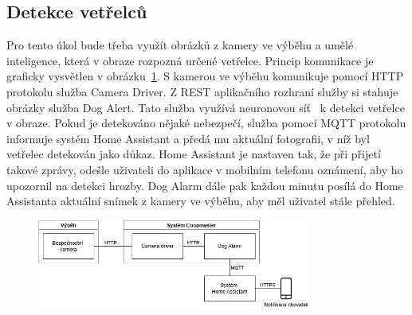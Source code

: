 \subsection{Detekce vetřelců}
Pro tento úkol bude třeba využít obrázků z kamery ve výběhu a umělé inteligence, která v obraze rozpozná určené vetřelce.
Princip komunikace je graficky vysvětlen v obrázku~\ref{fig:detekce_vetrelcu}.\newline
S kamerou ve výběhu komunikuje pomocí HTTP protokolu služba Camera Driver.
Z REST aplikačního rozhraní služby si stahuje obrázky služba Dog Alert.
Tato služba využívá neuronovou síť~\cite{neuronovesite} k detekci vetřelce v obraze.
Pokud je detekováno nějaké nebezpečí, služba pomocí MQTT protokolu informuje systém Home Assistant a předá mu aktuální fotografii, v níž byl vetřelec detekován jako důkaz.
Home Assistant je nastaven tak, že při přijetí takové zprávy, odešle uživateli do aplikace v mobilním telefonu oznámení, aby ho upozornil na detekci hrozby.
Dog Alarm dále pak každou minutu posílá do Home Assistanta aktuální snímek z kamery ve výběhu, aby měl uživatel stále přehled.
\begin{figure}[H]
    \centering
    \includegraphics[width=0.8\textwidth]{img/detekce_vetrelcu}
    \label{fig:detekce_vetrelcu}
\end{figure}

